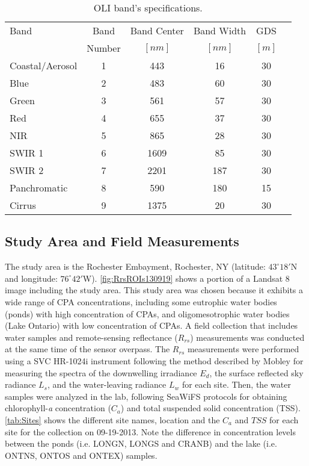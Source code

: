 \documentclass[]{spie}  %
\begin{document}
\begin{table}[!ht]
\caption{ OLI band's specifications. \label{tab:L8specs} } 
\vspace{0.2cm}
\centering
\begin{tabular}{lccccl} 
 \hline
Band  			&	Band 		& Band Center 	&	Band Width  &	GDS  	\\ 
      			&   Number 	    &	$[nm]$ 		&	$[nm]$		& $[m]$ 	\\ \hline \hline
Coastal/Aerosol & 	1 			&	443  		& 	16 			& 30	 	\\  	
Blue 			& 	2 			&	483  		& 	60 			& 30	 	\\  	
Green 			& 	3 			&	561  		& 	57 			& 30 	 	\\  	
Red 			& 	4 			&	655  		& 	37 			& 30	 	\\  	
NIR 			& 	5 			&	865  		& 	28			& 30	 	\\  	
SWIR 1 			& 	6 			&	1609 		& 	85 			& 30	 	\\  	
SWIR 2 			& 	7 			&	2201 		& 	187 		& 30	 	\\  	
Panchromatic 	&	8 			&	590  		& 	180 		& 15	 	\\  	
Cirrus 			&	9 			&	1375 		& 	20 			& 30	 	\\	\hline
 \end{tabular}	
\end{table}	
\subsection{Study Area and Field Measurements}

The study area is the Rochester Embayment, Rochester, NY (latitude: $43^\circ18'$N and longitude: $76^\circ42'$W). \autoref{fig:RrsROIs130919} shows a portion of a Landsat 8 image including the study area. This study area was chosen because it exhibits a wide range of CPA concentrations, including some eutrophic water bodies (ponds) with high concentration of CPAs, and oligomesotrophic water bodies (Lake Ontario) with low concentration of CPAs. A field collection that includes water samples and remote-sensing reflectance ($R_{rs}$) measurements was conducted at the same time of the sensor overpass. The $R_{rs}$ measurements were performed using a SVC HR-1024i instrument\cite{SVCHR1024i} following the method described by Mobley\cite{Mobley:1999} for measuring the spectra of the downwelling irradiance $E_d$, the surface reflected sky radiance $L_s$, and the water-leaving radiance $L_w$ for each site. Then, the water samples were analyzed in the lab, following SeaWiFS protocols\cite{Mueller1995} for obtaining chlorophyll-{\it a} concentration ($C_a$) and total suspended solid concentration (TSS). \autoref{tab:Sites} shows the different site names, location and the $C_a$ and $TSS$ for each site for the collection on 09-19-2013. Note the difference in concentration levels between the ponds (i.e. LONGN, LONGS and CRANB) and the lake (i.e. ONTNS, ONTOS and ONTEX) samples.
\end{document}
